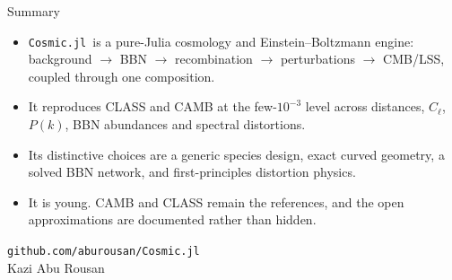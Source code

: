 \documentclass[10pt,aspectratio=43]{beamer}
\newcommand{\cl}{C_\ell}
\newcommand{\Cosmic}{\textcolor{cdeep}{\texttt{Cosmic.jl}}}
\begin{document}
\begin{frame}{Summary}
  \begin{itemize}
    \item \Cosmic\ is a pure-Julia cosmology and Einstein--Boltzmann engine:
      background $\to$ BBN $\to$ recombination $\to$ perturbations $\to$
      CMB/LSS, coupled through one composition.
    \item It reproduces CLASS and CAMB at the few-$10^{-3}$ level across
      distances, $\cl$, $P(k)$, BBN abundances and spectral distortions.
    \item Its distinctive choices are a generic species design, exact curved
      geometry, a solved BBN network, and first-principles distortion physics.
    \item It is young. CAMB and CLASS remain the references, and the open
      approximations are documented rather than hidden.
  \end{itemize}
  \vfill
  \begin{center}
    \textcolor{cdeep}{\texttt{github.com/aburousan/Cosmic.jl}}\\[0.5ex]
    \small Kazi Abu Rousan
  \end{center}
\end{frame}
\end{document}
